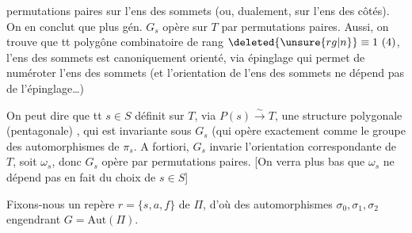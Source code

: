   permutations paires sur l'ens des sommets (ou, dualement, sur l'ens des côtés).  On en conclut que plus gén. $G_s$ opère  sur $T$ par permutations paires. Aussi, on trouve que  tt polygône combinatoire de rang $\deleted{\unsure{rg|n}}\equiv1\ (4)$, l'ens des sommets est canoniquement orienté, via épinglage qui permet de numéroter l'ens des sommets (et l'orientation de l'ens des sommets ne dépend pas de l'épinglage\ldots)

On peut  dire que tt $s\in S$ définit sur $T$, via $P(s)\xrightarrow{\sim}T$, une structure polygonale (pentagonale) , qui est invariante sous $G_s$ (qui opère exactement comme le groupe des automorphismes de $\pi_s$. A fortiori, $G_s$ invarie l'orientation correspondante de $T$, soit $\omega_s$, donc $G_s$ opère par permutations paires. [On verra plus bas que $\omega_s$ ne dépend pas en fait du choix de $s\in S$]

Fixons-nous un repère $r=\{s,a,f\}$ de $\Pi$, d'où des automorphismes $\sigma_0,\sigma_1,\sigma_2$ engendrant $G=\mathrm{Aut}(\Pi)$.
